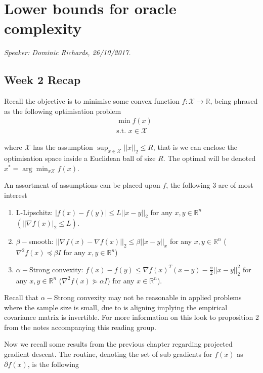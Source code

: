 
\chapter{Lower bounds for oracle complexity}

\emph{Speaker: Dominic Richards, 26/10/2017.}\\

\section{Week 2 Recap}

Recall the objective is to minimise some convex function $f: \mathcal{X} \rightarrow \mathbb{R}$, being phrased as the following optimisation problem
\begin{align}
& \min f(x) \\
& \text{s.t. } x \in \mathcal{X}
\end{align}


where $\mathcal{X}$ has the assumption $\sup_{x \in \mathcal{X}} ||x||_2 \leq R$, that is we can enclose the optimisation space inside a Euclidean ball of size $R$. The optimal will be denoted $x^{*} = \arg\min_{x  \mathcal{X}} f(x)$.  

An assortment of assumptions can be placed upon $f$, the following 3 are of most interest

\begin{enumerate}
\item{L-Lipschitz: $|f(x) - f(y)| \leq L ||x-y||_2$ for any $x,y \in \mathbb{R}^n$ $(||\nabla f(x)|_2 \leq L)$.}
\item{$\beta-$smooth: $||\nabla f(x) - \nabla f(x)||_2 \leq \beta||x-y||_x$ for any $x,y \in \mathbb{R}^n$ ($\nabla^2 f(x) \preccurlyeq \beta I$ for any $x,y \in \mathbb{R}^n$)}
\item{$\alpha-$Strong convexity: $f(x) - f(y) \leq \nabla f(x)^T (x-y) - \frac{\alpha}{2} ||x-y||_2^2$ for any $x,y \in \mathbb{R}^n$ ($\nabla^2 f(x)  \curlyeqsucc \alpha I$) for any $x \in \mathbb{R}^n$)}.
\end{enumerate}

Recall that $\alpha-$Strong convexity may not be reasonable in applied problems where the sample size is small, due to is aligning implying the empirical covariance matrix is invertible. For more information on this look  to proposition 2 from the notes accompanying this reading group. 


Now we recall some results from the previous chapter regarding projected gradient descent. The routine, denoting the set of sub gradients for $f(x)$ as $\partial f(x)$, is the following

